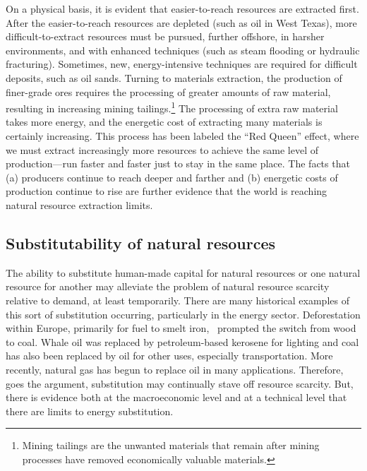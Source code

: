 On a physical basis, 
it is evident that easier-to-reach resources are extracted first. 
After the easier-to-reach resources are depleted (such as oil in West Texas),
more difficult-to-extract resources must be pursued,
further offshore,
in harsher environments, and
with enhanced techniques 
(such as steam flooding or hydraulic fracturing).
Sometimes, new, energy-intensive techniques are required 
for difficult deposits, such as oil sands.
Turning to materials extraction, the production of finer-grade ores
requires the processing of greater amounts of raw material, 
resulting in increasing mining tailings.\footnote{Mining tailings
	are the unwanted materials that remain after mining processes
	have removed economically valuable materials.\cite{Mudd2007}
	}
The processing of extra raw material takes more energy, and 
the energetic cost of extracting many materials is certainly increasing.\cite{Hall1986, Mudd2010, Hall2011}
This process has been labeled the ``Red Queen'' effect, 
where we must extract increasingly more resources to achieve the same
level of production---run faster and faster just to stay in 
the same place.\cite{Lees1975, Ross1988, Murray2013, Murphy2014}
The facts that (a) producers continue to reach deeper and farther 
and (b) energetic costs of production continue to rise
are further evidence that the world is reaching natural resource extraction limits.


\subsection{Substitutability of natural resources}

The ability to substitute human-made capital for natural resources
or one natural resource for another 
may alleviate the problem of natural resource scarcity relative to demand,
at least temporarily.
There are many historical examples of this sort of substitution occurring,
particularly in the energy sector.
Deforestation within Europe,
primarily for fuel to smelt iron,~\cite{Smil1994}
prompted the switch from wood to coal.
Whale oil was replaced by petroleum-based kerosene for lighting and
coal has also been replaced by oil for other uses, 
especially transportation.\cite{Weissenbacher2009}
More recently, natural gas has begun to replace oil in many applications.
Therefore, goes the argument, 
substitution may continually stave off resource scarcity.
But, there is evidence both at the macroeconomic level and 
at a technical level that there are limits to energy substitution.

